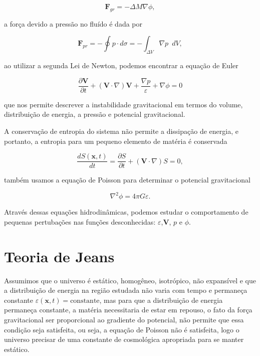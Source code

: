 \begin{equation}\label{eq4}
	\textbf{F}_{gr} = - \Delta M \nabla\phi,
\end{equation}

a força devido a pressão no fluído é dada por 

\begin{equation}\label{eq5}
	\textbf{F}_{pr} = - \oint p \cdot d\sigma = - \int_{\Delta V} \nabla p\,\,\, dV,
\end{equation}

ao utilizar a segunda Lei de Newton, podemos encontrar a equação de Euler

\begin{equation}\label{eq6}
	\dfrac{\partial \textbf{V}}{\partial t} + (\textbf{V} \cdot \nabla) \textbf{V} + \dfrac{\nabla p}{\varepsilon} + \nabla\phi = 0
\end{equation}

 que nos permite descrever a instabilidade gravitacional em termos do volume, distribuição de energia, a pressão e potencial gravitacional.
 
 A conservação de entropia do sistema não permite a dissipação de energia, e portanto, a entropia para um pequeno elemento de matéria é conservada
 
 \begin{equation}\label{eq7}
 	\dfrac{d S(\textbf{x},t)}{dt} = \dfrac{\partial S}{\partial t} + (\textbf{V} \cdot \nabla) S = 0,
 \end{equation} 
 
 também usamos a equação de Poisson para determinar o potencial gravitacional
 
 \begin{equation}\label{eq8}
 	\nabla^2\phi = 4\pi G\varepsilon.
 \end{equation}

Através dessas equações hidrodinâmicas, podemos estudar o comportamento de pequenas pertubações nas funções desconhecidas: $ \varepsilon $,$ \textbf{V} $, $ p $ e $ \phi $.

\section*{Teoria de Jeans}

Assumimos que o universo é estático, homogêneo, isotrópico, não expansível e que a distribuição de energia na região estudada não varia com tempo e permaneça constante $\varepsilon (\mathbf{x},t) = \text{constante}$, mas para que a distribuição de energia permaneça constante, a matéria necessitaria de estar em repouso, o fato da força gravitacional ser proporcional ao gradiente do potencial, não permite que essa condição seja satisfeita, ou seja, a equação de Poisson não é satisfeita, logo o universo precisar de uma constante de cosmológica apropriada para se manter estático.

